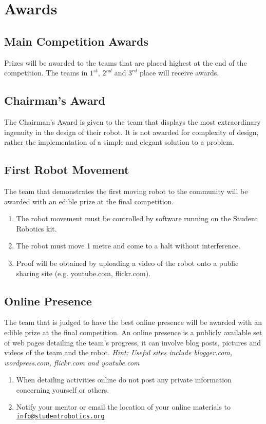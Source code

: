 \section {Awards}
\label{sec:Awards}

\subsection{Main Competition Awards}
Prizes will be awarded to the teams that are placed highest at the end of the competition.  The teams in $1^{st}$, $2^{nd}$ and $3^{rd}$ place will receive awards.

\subsection{Chairman's Award}
The Chairman's Award is given to the team that displays the most extraordinary ingenuity in the design of their robot. It is not awarded for complexity of design, rather the implementation of a simple and elegant solution to a problem.

\subsection{First Robot Movement}
The team that demonstrates the first moving robot to the community will be awarded with an edible prize at the final competition.
\begin{enumerate}
\item The robot movement must be controlled by software running on the Student Robotics kit.
\item The robot must move 1 metre and come to a halt without interference.
\item Proof will be obtained by uploading a video of the robot onto a public sharing site (e.g. youtube.com, flickr.com).
\end{enumerate}


\subsection{Online Presence}
The team that is judged to have the best online presence will be awarded with an edible prize at the final competition.  An online presence is a publicly available set of web pages detailing the team's progress, it can involve blog posts, pictures and videos of the team and the robot.  \emph{Hint: Useful sites include blogger.com, wordpress.com, flickr.com and youtube.com}
\begin{enumerate}
\item When detailing activities online do not post any private information concerning yourself or others.
\item Notify your mentor or email the location of your online materials to \linebreak\href{mailto:info@studentrobotics.org}{\nolinkurl{info@studentrobotics.org}}
\end{enumerate}
